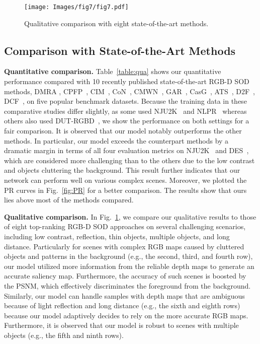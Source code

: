 \documentclass[runningheads]{llncs}
\begin{document}
	\begin{figure}[t]
		\setlength{\belowcaptionskip}{-24pt}
		\begin{center}
			\texttt{[image: Images/fig7/fig7.pdf]}
			\caption{Qualitative comparison with eight state-of-the-art methods.}
			\label{fig7}
		\end{center}
	\end{figure} 
	
	\subsection{Comparison with State-of-the-Art Methods}
	\textbf{Quantitative comparison.} Table~\ref{table:qua} shows our quantitative performance compared with 10 recently published state-of-the-art RGB-D SOD methods, DMRA \cite{piao2019depth}, CPFP~\cite{zhao2019contrast}, CIM~\cite{zhang2020select}, CoN~\cite{ji2020accurate}, CMWN~\cite{li2020cross}, GAR~\cite{chen2020progressively}, CasG~\cite{luo2020cascade}, ATS~\cite{zhang2020asymmetric}, D2F~\cite{sun2021deep}, DCF~\cite{ji2021calibrated}, on five popular benchmark datasets. Because the training data in these comparative studies differ slightly, as some used NJU2K~\cite{ju2014depth} and NLPR~\cite{peng2014rgbd} whereas others also used DUT-RGBD~\cite{piao2019depth}, we show the performance on both settings for a fair comparison. It is observed that our model notably outperforms the other methods. In particular, our model exceeds the counterpart methods by a dramatic margin in terms of all four evaluation metrics on NJU2K~\cite{ju2014depth} and DES~\cite{cheng2014depth}, which are considered more challenging than to the others due to the low contrast and objects cluttering the background. This result further indicates that our network can perform well on various complex scenes. Moreover, we plotted the PR curves in Fig.~\ref{fig:PR} for a better comparison. The results show that ours lies above most of the methods compared.
	
	\noindent \textbf{Qualitative comparison.} In Fig.~\ref{fig7}, we compare our qualitative results to those of eight top-ranking RGB-D SOD approaches on several challenging scenarios, including low contrast, reflection, thin objects, multiple objects, and long distance. Particularly for scenes with complex RGB maps caused by cluttered objects and patterns in the background (e.g., the second, third, and fourth row), our model utilized more information from the reliable depth maps to generate an accurate saliency map. Furthermore, the accuracy of such scenes is boosted by the PSNM, which effectively discriminates the foreground from the background. Similarly, our model can handle samples with depth maps that are ambiguous because of light reflection and long distance (e.g., the sixth and eighth rows) because our model adaptively decides to rely on the more accurate RGB maps. Furthermore, it is observed that our model is robust to scenes with multiple objects (e.g., the fifth and ninth rows).
	
\end{document}
